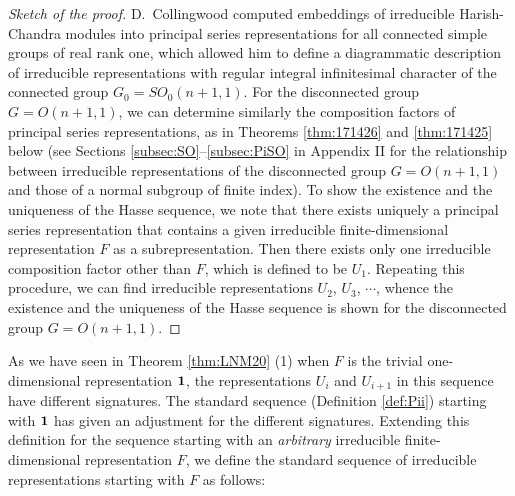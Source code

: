 \begin{proof}
[Sketch of the proof]  
D.~Collingwood \cite[Chap.~6]{C} computed embeddings
 of irreducible Harish-Chandra modules
 into principal series representations
 for all connected simple groups of real rank one, 
 which allowed him to define a diagrammatic description 
 of irreducible representations
 with regular integral infinitesimal character 
 of the connected group
 $G_0=SO_0(n+1,1)$.
For the disconnected group $G=O(n+1,1)$,
 we can determine similarly the composition factors
 of principal series representations,
 as in Theorems \ref{thm:171426} and \ref{thm:171425} below
 (see Sections \ref{subsec:SO}--\ref{subsec:PiSO} in Appendix II
 for the relationship 
 between irreducible representations of the disconnected group $G=O(n+1,1)$
 and those of a normal subgroup of finite index).  
To show the existence and the uniqueness
 of the Hasse sequence, 
 we note that there exists uniquely a principal series representation
 that contains a given irreducible finite-dimensional representation 
$F$ 
 as a subrepresentation.  
Then there exists only one irreducible composition factor
 other than $F$, 
 which is defined to be $U_1$.  
Repeating this procedure, 
 we can find irreducible representations $U_2$, $U_3$, $\cdots$, 
 whence the existence and the uniqueness of the Hasse sequence is shown for the disconnected group $G=O(n+1,1)$.  
\end{proof}



As we have seen in Theorem \ref{thm:LNM20} (1)
 when $F$ is the trivial one-dimensional representation ${\bf{1}}$, 
 the representations $U_i$ and $U_{i+1}$
 in this sequence have different signatures.  
The standard sequence (Definition \ref{def:Pii})
 starting with ${\bf{1}}$ 
 has given an adjustment
 for the different signatures.  
Extending this definition for the sequence
 starting 
 with an {\it{arbitrary}} irreducible finite-dimensional representation $F$, 
  we define the standard sequence of irreducible representations
 starting with $F$ as follows:

